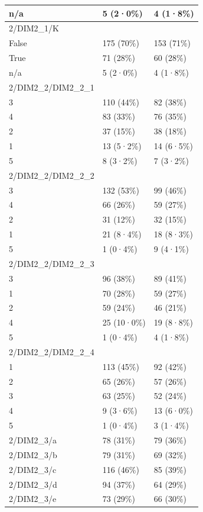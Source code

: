 \documentclass[
]{book}
\begin{document}
\begin{tabular}{l|l|l}
\hline
n/a & 5 (2·0\%) & 4 (1·8\%)\\
\hline
2/DIM2\_1/K &  & \\
\hline
False & 175 (70\%) & 153 (71\%)\\
\hline
True & 71 (28\%) & 60 (28\%)\\
\hline
n/a & 5 (2·0\%) & 4 (1·8\%)\\
\hline
2/DIM2\_2/DIM2\_2\_1 &  & \\
\hline
3 & 110 (44\%) & 82 (38\%)\\
\hline
4 & 83 (33\%) & 76 (35\%)\\
\hline
2 & 37 (15\%) & 38 (18\%)\\
\hline
1 & 13 (5·2\%) & 14 (6·5\%)\\
\hline
5 & 8 (3·2\%) & 7 (3·2\%)\\
\hline
2/DIM2\_2/DIM2\_2\_2 &  & \\
\hline
3 & 132 (53\%) & 99 (46\%)\\
\hline
4 & 66 (26\%) & 59 (27\%)\\
\hline
2 & 31 (12\%) & 32 (15\%)\\
\hline
1 & 21 (8·4\%) & 18 (8·3\%)\\
\hline
5 & 1 (0·4\%) & 9 (4·1\%)\\
\hline
2/DIM2\_2/DIM2\_2\_3 &  & \\
\hline
3 & 96 (38\%) & 89 (41\%)\\
\hline
1 & 70 (28\%) & 59 (27\%)\\
\hline
2 & 59 (24\%) & 46 (21\%)\\
\hline
4 & 25 (10·0\%) & 19 (8·8\%)\\
\hline
5 & 1 (0·4\%) & 4 (1·8\%)\\
\hline
2/DIM2\_2/DIM2\_2\_4 &  & \\
\hline
1 & 113 (45\%) & 92 (42\%)\\
\hline
2 & 65 (26\%) & 57 (26\%)\\
\hline
3 & 63 (25\%) & 52 (24\%)\\
\hline
4 & 9 (3·6\%) & 13 (6·0\%)\\
\hline
5 & 1 (0·4\%) & 3 (1·4\%)\\
\hline
2/DIM2\_3/a & 78 (31\%) & 79 (36\%)\\
\hline
2/DIM2\_3/b & 79 (31\%) & 69 (32\%)\\
\hline
2/DIM2\_3/c & 116 (46\%) & 85 (39\%)\\
\hline
2/DIM2\_3/d & 94 (37\%) & 64 (29\%)\\
\hline
2/DIM2\_3/e & 73 (29\%) & 66 (30\%)\\

\end{tabular}
\end{document}
